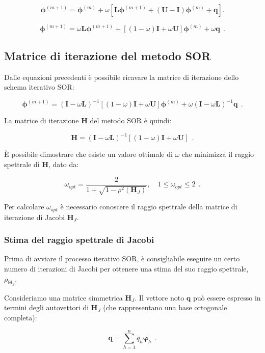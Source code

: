\[
\mathbf{\phi}^{(m+1)} = \mathbf{\phi}^{(m)} + \omega \left[ \mathbf{L} \mathbf{\phi}^{(m+1)} + (\mathbf{U} - \mathbf{I}) \mathbf{\phi}^{(m)} + \mathbf{q} \right].
\]

\[
\mathbf{\phi}^{(m+1)} = \omega \mathbf{L} \mathbf{\phi}^{(m+1)} + \left[ (1 - \omega) \mathbf{I} + \omega \mathbf{U} \right] \mathbf{\phi}^{(m)} + \omega \mathbf{q}\ \ . 
\]


%
\subsection{Matrice di iterazione del metodo SOR}

Dalle equazioni precedenti è possibile ricavare la matrice di iterazione dello schema iterativo SOR:

\[
\mathbf{\phi}^{(m+1)} = \left( \mathbf{I} - \omega \mathbf{L} \right)^{-1} \left[ (1 - \omega) \mathbf{I} + \omega \mathbf{U} \right] \mathbf{\phi}^{(m)} + \omega \left( \mathbf{I} - \omega \mathbf{L} \right)^{-1} \mathbf{q}\ \ . 
\]

La matrice di iterazione \(\mathbf{H}\) del metodo SOR è quindi:

\[
\mathbf{H} = \left( \mathbf{I} - \omega \mathbf{L} \right)^{-1} \left[ (1 - \omega) \mathbf{I} + \omega \mathbf{U} \right]\ \ . 
\]

È possibile dimostrare che esiste un valore ottimale di \(\omega\) che minimizza il raggio spettrale di \(\mathbf{H}\), dato da:

\[
\omega_{opt} = \frac{2}{1 + \sqrt{1 - \rho^2(\mathbf{H}_J)}}, \quad 1 \leq \omega_{opt} \leq 2\ \ . 
\]

Per calcolare \(\omega_{opt}\) è necessario conoscere il raggio spettrale della matrice di iterazione di Jacobi \(\mathbf{H}_J\).

\subsubsection{Stima del raggio spettrale di Jacobi}

Prima di avviare il processo iterativo SOR, è consigliabile eseguire un certo numero di iterazioni di Jacobi per ottenere una stima del suo raggio spettrale, \(\rho_{\mathbf{H}_J}\).

Consideriamo una matrice simmetrica \(\mathbf{H}_J\). Il vettore noto \(\mathbf{q}\) può essere espresso in termini degli autovettori di \(\mathbf{H}_J\) (che rappresentano una base ortogonale completa):

\[
\mathbf{q} = \sum_{h=1}^{n} q_h \mathbf{\varphi}_h\ \ . 
\]

